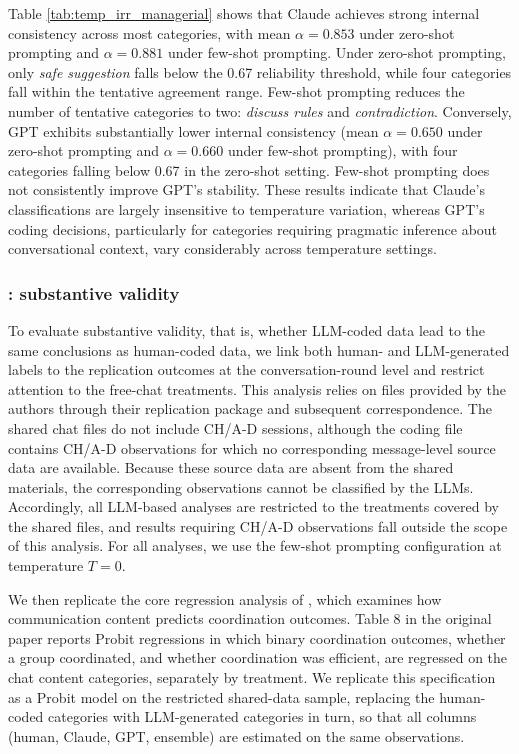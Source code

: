 \documentclass[11pt]{article}
\begin{document}
\begin{sloppypar}


Table \ref{tab:temp_irr_managerial} shows that Claude achieves strong internal consistency across most categories, with mean $\alpha = 0.853$ under zero-shot prompting and $\alpha = 0.881$ under few-shot prompting. Under zero-shot prompting, only \textit{safe suggestion} falls below the 0.67 reliability threshold, while four categories fall within the tentative agreement range. Few-shot prompting reduces the number of tentative categories to two: \textit{discuss rules} and \textit{contradiction}. Conversely, GPT exhibits substantially lower internal consistency (mean $\alpha = 0.650$ under zero-shot prompting and $\alpha = 0.660$ under few-shot prompting), with four categories falling below 0.67 in the zero-shot setting. Few-shot prompting does not consistently improve GPT’s stability. These results indicate that Claude’s classifications are largely insensitive to temperature variation, whereas GPT’s coding decisions, particularly for categories requiring pragmatic inference about conversational context, vary considerably across temperature settings.


\subsubsection{\citet{brandts_cooper_2025}: substantive validity}

To evaluate substantive validity, that is, whether LLM-coded data lead to the same conclusions as human-coded data, we link both human- and LLM-generated labels to the replication outcomes at the conversation-round level and restrict attention to the free-chat treatments. This analysis relies on files provided by the authors through their replication package and subsequent correspondence. The shared chat files do not include CH/A-D sessions, although the coding file contains CH/A-D observations for which no corresponding message-level source data are available. Because these source data are absent from the shared materials, the corresponding observations cannot be classified by the LLMs. Accordingly, all LLM-based analyses are restricted to the treatments covered by the shared files, and results requiring CH/A-D observations fall outside the scope of this analysis. For all analyses, we use the few-shot prompting configuration at temperature $T = 0$.

We then replicate the core regression analysis of \citet{brandts_cooper_2025}, which examines how communication content predicts coordination outcomes. Table 8 in the original paper reports Probit regressions in which binary coordination outcomes, whether a group coordinated, and whether coordination was
efficient, are regressed on the chat content categories, separately by treatment. We replicate this specification as a Probit model on the restricted shared-data sample, replacing the human-coded categories with LLM-generated categories in turn, so that all columns (human, Claude, GPT, ensemble) are estimated on the same observations.


\end{sloppypar}
\end{document}
